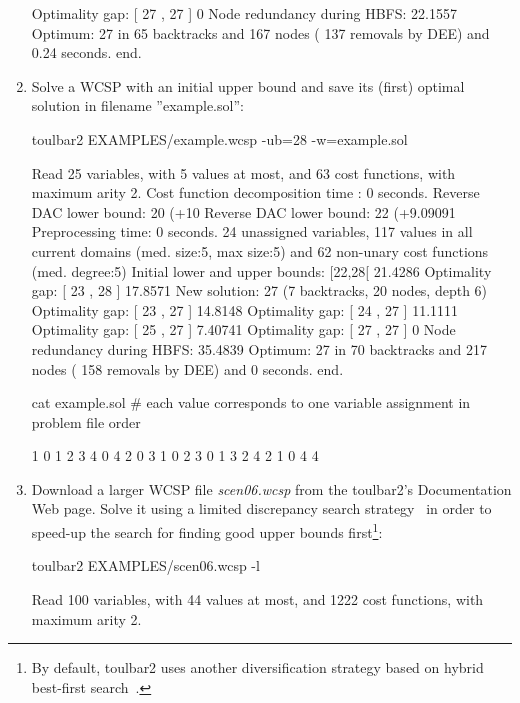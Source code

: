 \begin{enumerate}
{\begin{DoxyCode}
Optimality gap: [ 27 , 27 ] 0 %
Node redundancy during HBFS: 22.1557 %
Optimum: 27 in 65 backtracks and 167 nodes ( 137 removals by DEE) and 0.24 seconds.
end.
\end{DoxyCode}}
\item Solve a WCSP with an initial upper bound and save its (first) optimal solution
in filename ''example.sol'':
\begin{DoxyCode}
	toulbar2 EXAMPLES/example.wcsp -ub=28 -w=example.sol
\end{DoxyCode}
{\scriptsize
\begin{DoxyCode}
Read 25 variables, with 5 values at most, and 63 cost functions, with maximum arity 2.
Cost function decomposition time : 0 seconds.
Reverse DAC lower bound: 20 (+10%
Reverse DAC lower bound: 22 (+9.09091%
Preprocessing time: 0 seconds.
24 unassigned variables, 117 values in all current domains (med. size:5, max size:5) and 62 non-unary cost functions (med. degree:5)
Initial lower and upper bounds: [22,28[ 21.4286%
Optimality gap: [ 23 , 28 ] 17.8571 %
New solution: 27 (7 backtracks, 20 nodes, depth 6)
Optimality gap: [ 23 , 27 ] 14.8148 %
Optimality gap: [ 24 , 27 ] 11.1111 %
Optimality gap: [ 25 , 27 ] 7.40741 %
Optimality gap: [ 27 , 27 ] 0 %
Node redundancy during HBFS: 35.4839 %
Optimum: 27 in 70 backtracks and 217 nodes ( 158 removals by DEE) and 0 seconds.
end.
\end{DoxyCode}}
\begin{DoxyCode}
cat example.sol
# each value corresponds to one variable assignment in problem file order
\end{DoxyCode}
{\scriptsize
\begin{DoxyCode}
 1 0 1 2 3 4 0 4 2 0 3 1 0 2 3 0 1 3 2 4 2 1 0 4 4
\end{DoxyCode}}
\item Download a larger WCSP file {\em scen06.wcsp} from the toulbar2's Documentation Web page. Solve it using a limited discrepancy search strategy~\cite{Ginsberg95} in order to speed-up the search for finding good upper bounds first\footnote{By default, toulbar2 uses another diversification strategy based on hybrid best-first search~\cite{Katsirelos15a}.}:
\begin{DoxyCode}
	toulbar2 EXAMPLES/scen06.wcsp -l
\end{DoxyCode}
{\scriptsize
\begin{DoxyCode}
Read 100 variables, with 44 values at most, and 1222 cost functions, with maximum arity 2.

\end{DoxyCode}}
\end{enumerate}
